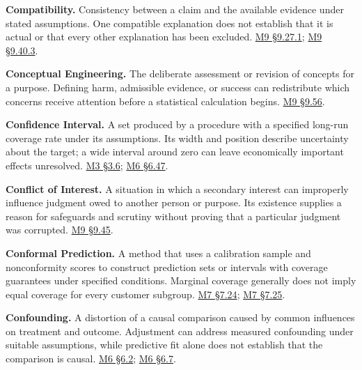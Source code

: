 \noindent\textbf{Compatibility.} Consistency between a claim and the available
evidence under stated assumptions. One compatible explanation does not
establish that it is actual or that every other explanation has been
excluded.
\hyperref[M09-premises-consequences-and-counterexamples]{M9
§9.27.1};
\hyperref[M09-compatibility-identification-and-valuation]{M9
§9.40.3}.

\noindent\textbf{Conceptual Engineering.} The deliberate assessment or revision
of concepts for a purpose. Defining harm, admissible evidence, or
success can redistribute which concerns receive attention before a
statistical calculation begins.
\hyperref[M09-evidentiary-standards-as-conceptual-engineering]{M9
§9.56}.

\noindent\textbf{Confidence Interval.} A set produced by a procedure with a
specified long-run coverage rate under its assumptions. Its width and
position describe uncertainty about the target; a wide interval around
zero can leave economically important effects unresolved.
\href{Marketing_Analytics_Lecture_Notes.pdf\#M03-uncertainty-dependence-and-practical-importance}{M3
§3.6};
\href{Marketing_Analytics_Lecture_Notes.pdf\#M06-choosing-the-null-for-a-claim-about-harm}{M6
§6.47}.

\noindent\textbf{Conflict of Interest.} A situation in which a secondary interest
can improperly influence judgment owed to another person or purpose. Its
existence supplies a reason for safeguards and scrutiny without proving
that a particular judgment was corrupted.
\hyperref[M09-conflicts-of-interest-and-the-analysts-judgment]{M9
§9.45}.

\noindent\textbf{Conformal Prediction.} A method that uses a calibration sample
and nonconformity scores to construct prediction sets or intervals with
coverage guarantees under specified conditions. Marginal coverage
generally does not imply equal coverage for every customer subgroup.
\href{Marketing_Analytics_Lecture_Notes.pdf\#M07-demand-intervals-and-the-distribution-of-forecast-errors}{M7
§7.24};
\href{Marketing_Analytics_Lecture_Notes.pdf\#M07-prediction-sets-and-customer-service-routing}{M7
§7.25}.

\noindent\textbf{Confounding.} A distortion of a causal comparison caused by
common influences on treatment and outcome. Adjustment can address
measured confounding under suitable assumptions, while predictive fit
alone does not establish that the comparison is causal.
\href{Marketing_Analytics_Lecture_Notes.pdf\#M06-why-the-treated-untreated-difference-can-be-biased}{M6
§6.2};
\href{Marketing_Analytics_Lecture_Notes.pdf\#M06-observational-adjustment-and-its-limits}{M6
§6.7}.

